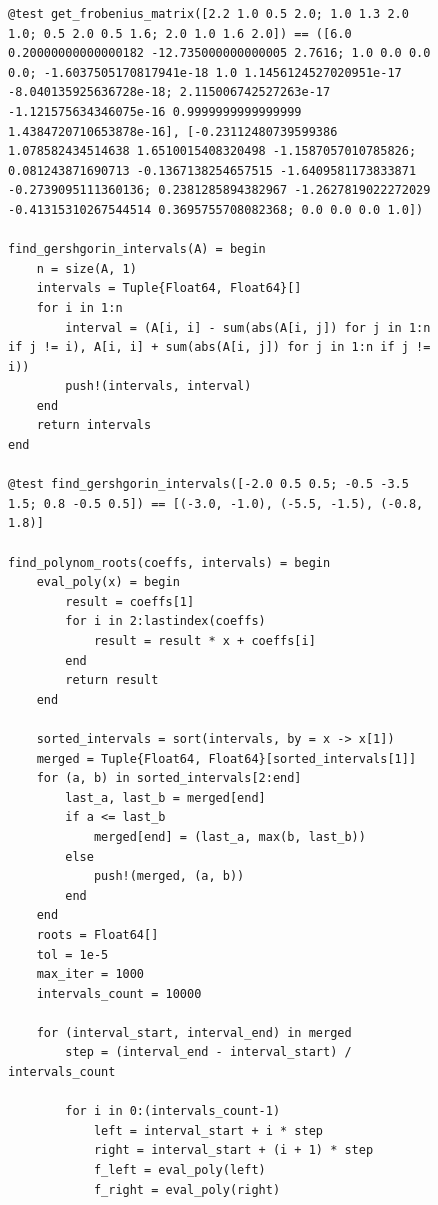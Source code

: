 \documentclass[a4paper, 14pt]{extarticle}
\begin{document}
\begin{figure}[!htb]
\begin{lstlisting}[language={},caption={Метод Крылова (продолжение)},label={lst:code2}]
@test get_frobenius_matrix([2.2 1.0 0.5 2.0; 1.0 1.3 2.0 1.0; 0.5 2.0 0.5 1.6; 2.0 1.0 1.6 2.0]) == ([6.0 0.20000000000000182 -12.735000000000005 2.7616; 1.0 0.0 0.0 0.0; -1.6037505170817941e-18 1.0 1.1456124527020951e-17 -8.040135925636728e-18; 2.115006742527263e-17 -1.121575634346075e-16 0.9999999999999999 1.4384720710653878e-16], [-0.23112480739599386 1.078582434514638 1.6510015408320498 -1.1587057010785826; 0.081243871690713 -0.1367138254657515 -1.6409581173833871 -0.2739095111360136; 0.2381285894382967 -1.2627819022272029 -0.41315310267544514 0.3695755708082368; 0.0 0.0 0.0 1.0])

find_gershgorin_intervals(A) = begin
    n = size(A, 1)
    intervals = Tuple{Float64, Float64}[]
    for i in 1:n
        interval = (A[i, i] - sum(abs(A[i, j]) for j in 1:n if j != i), A[i, i] + sum(abs(A[i, j]) for j in 1:n if j != i))
        push!(intervals, interval)
    end
    return intervals
end

@test find_gershgorin_intervals([-2.0 0.5 0.5; -0.5 -3.5 1.5; 0.8 -0.5 0.5]) == [(-3.0, -1.0), (-5.5, -1.5), (-0.8, 1.8)]

find_polynom_roots(coeffs, intervals) = begin
    eval_poly(x) = begin
        result = coeffs[1]
        for i in 2:lastindex(coeffs)
            result = result * x + coeffs[i]
        end
        return result
    end

    sorted_intervals = sort(intervals, by = x -> x[1])
    merged = Tuple{Float64, Float64}[sorted_intervals[1]]
    for (a, b) in sorted_intervals[2:end]
        last_a, last_b = merged[end]
        if a <= last_b
            merged[end] = (last_a, max(b, last_b))
        else
            push!(merged, (a, b))
        end
    end
    roots = Float64[]
    tol = 1e-5
    max_iter = 1000
    intervals_count = 10000

    for (interval_start, interval_end) in merged
        step = (interval_end - interval_start) / intervals_count

        for i in 0:(intervals_count-1)
            left = interval_start + i * step
            right = interval_start + (i + 1) * step
            f_left = eval_poly(left)
            f_right = eval_poly(right)
\end{lstlisting}
\end{figure}
\end{document}
